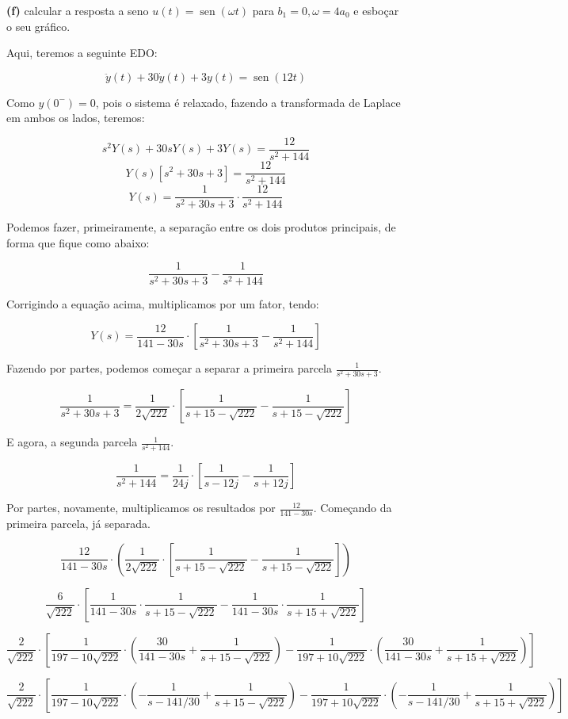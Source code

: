 \documentclass{article}
\DeclareMathOperator{\sen}{sen}
\begin{document}
\textbf{(f)} calcular a resposta a seno $u(t) = \sen(\omega t)$ para $b_1 = 0, \omega = 4a_0$ e esboçar o seu gráfico.

Aqui, teremos a seguinte EDO:

\[\ddot{y}(t) + 30\dot{y}(t) + 3y(t) = \sen(12t)\]

Como $y(0^-) = 0$, pois o sistema é relaxado, fazendo a transformada de Laplace em ambos os lados, teremos:

\[s^2Y(s) + 30sY(s) + 3Y(s) = \frac{12}{s^2 + 144}\]
\[Y(s)\left[s^2 + 30s + 3\right] = \frac{12}{s^2 + 144}\]
\[Y(s) = \frac{1}{s^2 + 30s + 3} \cdot \frac{12}{s^2 + 144}\]

Podemos fazer, primeiramente, a separação entre os dois produtos principais, de forma que fique como abaixo:

\[\frac{1}{s^2 + 30s + 3} - \frac{1}{s^2 + 144}\]

Corrigindo a equação acima, multiplicamos por um fator, tendo:

\[Y(s) = \frac{12}{141 - 30s} \cdot \left[\frac{1}{s^2 + 30s + 3} - \frac{1}{s^2 + 144}\right]\]

Fazendo por partes, podemos começar a separar a primeira parcela $\frac{1}{s^2 + 30s + 3}$.

\[\frac{1}{s^2 + 30s + 3} = \frac{1}{2\sqrt{222}} \cdot \left[ \frac{1}{s + 15 - \sqrt{222}} - \frac{1}{s + 15 - \sqrt{222}}\right]\]

E agora, a segunda parcela $\frac{1}{s^2 + 144}$.

\[\frac{1}{s^2 + 144} = \frac{1}{24j} \cdot \left[\frac{1}{s - 12j} - \frac{1}{s + 12j}\right]\]

Por partes, novamente, multiplicamos os resultados por $\frac{12}{141 - 30s}$. Começando da primeira parcela, já separada.

\[\frac{12}{141 - 30s} \cdot \left(\frac{1}{2\sqrt{222}} \cdot \left[
    \frac{1}{s + 15 - \sqrt{222}} - \frac{1}{s + 15 - \sqrt{222}}
\right]\right)\]

\[\frac{6}{\sqrt{222}} \cdot \left[ 
    \frac{1}{141 - 30s} \cdot \frac{1}{s + 15 - \sqrt{222}} - 
    \frac{1}{141 - 30s} \cdot \frac{1}{s + 15 + \sqrt{222}}
\right]\]

\[\frac{2}{\sqrt{222}} \cdot \left[ 
    \frac{1}{197 - 10\sqrt{222}} \cdot \left(\frac{30}{141 - 30s} + \frac{1}{s + 15 - \sqrt{222}}\right) -
    \frac{1}{197 + 10\sqrt{222}} \cdot \left(\frac{30}{141 - 30s} + \frac{1}{s + 15 + \sqrt{222}}\right)
\right]\]

\[\frac{2}{\sqrt{222}} \cdot \left[ 
    \frac{1}{197 - 10\sqrt{222}} \cdot \left(-\frac{1}{s - 141/30} + \frac{1}{s + 15 - \sqrt{222}}\right) -
    \frac{1}{197 + 10\sqrt{222}} \cdot \left(-\frac{1}{s - 141/30} + \frac{1}{s + 15 + \sqrt{222}}\right)
\right]\]
\end{document}
